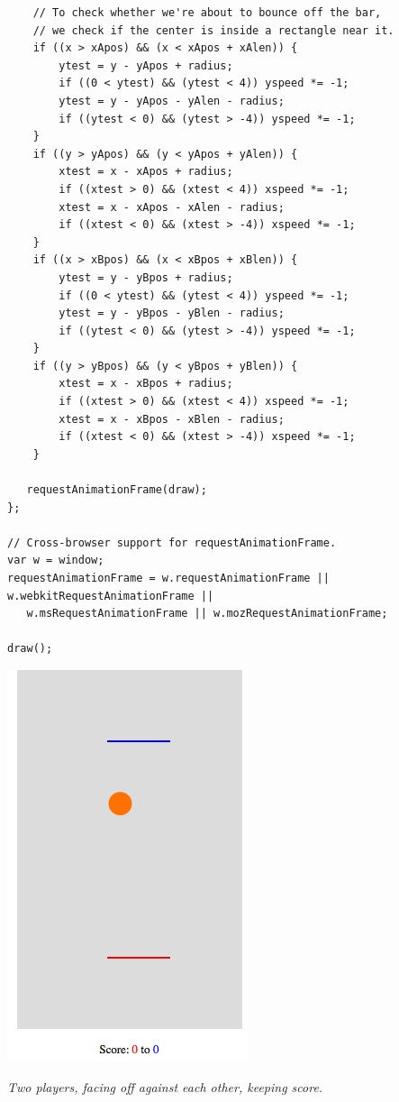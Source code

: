 \documentclass[11pt]{article}
\newcommand{\capt}[1]{\begin{minipage}{0.75\columnwidth}\itshape#1\end{minipage}}
\begin{document}
\begin{verbatim}
    // To check whether we're about to bounce off the bar,
    // we check if the center is inside a rectangle near it.
    if ((x > xApos) && (x < xApos + xAlen)) {
        ytest = y - yApos + radius;
        if ((0 < ytest) && (ytest < 4)) yspeed *= -1;
        ytest = y - yApos - yAlen - radius;
        if ((ytest < 0) && (ytest > -4)) yspeed *= -1;
    }
    if ((y > yApos) && (y < yApos + yAlen)) {
        xtest = x - xApos + radius;
        if ((xtest > 0) && (xtest < 4)) xspeed *= -1;
        xtest = x - xApos - xAlen - radius;
        if ((xtest < 0) && (xtest > -4)) xspeed *= -1;
    }
    if ((x > xBpos) && (x < xBpos + xBlen)) {
        ytest = y - yBpos + radius;
        if ((0 < ytest) && (ytest < 4)) yspeed *= -1;
        ytest = y - yBpos - yBlen - radius;
        if ((ytest < 0) && (ytest > -4)) yspeed *= -1;
    }
    if ((y > yBpos) && (y < yBpos + yBlen)) {
        xtest = x - xBpos + radius;
        if ((xtest > 0) && (xtest < 4)) xspeed *= -1;
        xtest = x - xBpos - xBlen - radius;
        if ((xtest < 0) && (xtest > -4)) xspeed *= -1;
    }

   requestAnimationFrame(draw);
};

// Cross-browser support for requestAnimationFrame.
var w = window;
requestAnimationFrame = w.requestAnimationFrame || w.webkitRequestAnimationFrame ||
   w.msRequestAnimationFrame || w.mozRequestAnimationFrame;

draw();
\end{verbatim}

\begin{center}
\includegraphics[width=0.5\columnwidth]{game-pong.png}

\capt{Two players, facing off against each other, keeping score.}
\end{center}
\end{document}
